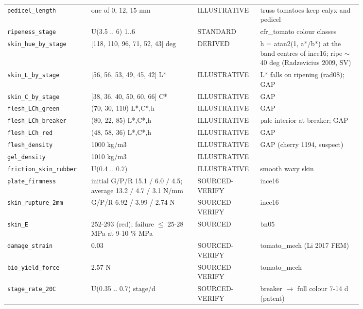 \documentclass[10.5pt,a4paper]{article}
\begin{document}
{\begin{longtable}{@{}p{0.2\linewidth}p{0.27\linewidth}p{0.12\linewidth}p{0.26\linewidth}@{}}
\texttt{pedicel\_\allowbreak{}length} & one of 0, 12, 15 mm & ILLUSTRATIVE & truss tomatoes keep calyx and pedicel \\
\texttt{ripeness\_\allowbreak{}stage} & U(3.5 .. 6) 1..6 & STANDARD & cfr\_tomato colour classes \\
\texttt{skin\_\allowbreak{}hue\_\allowbreak{}by\_\allowbreak{}stage} & [118, 110, 96, 71, 52, 43] deg & DERIVED & h = atan2(1, a*/b*) at the band centres of ince16; ripe $\sim$40 deg (Radzevicius 2009, SV) \\
\texttt{skin\_\allowbreak{}L\_\allowbreak{}by\_\allowbreak{}stage} & [56, 56, 53, 49, 45, 42] L* & ILLUSTRATIVE & L* falls on ripening (rad08); GAP \\
\texttt{skin\_\allowbreak{}C\_\allowbreak{}by\_\allowbreak{}stage} & [38, 36, 40, 50, 60, 66] C* & ILLUSTRATIVE & GAP \\
\texttt{flesh\_\allowbreak{}LCh\_\allowbreak{}green} & (70, 30, 110) L*,C*,h & ILLUSTRATIVE & GAP \\
\texttt{flesh\_\allowbreak{}LCh\_\allowbreak{}breaker} & (80, 22, 85) L*,C*,h & ILLUSTRATIVE & pale interior at breaker; GAP \\
\texttt{flesh\_\allowbreak{}LCh\_\allowbreak{}red} & (48, 58, 36) L*,C*,h & ILLUSTRATIVE & GAP \\
\texttt{flesh\_\allowbreak{}density} & 1000 kg/m3 & ILLUSTRATIVE & GAP (cherry 1194, suspect) \\
\texttt{gel\_\allowbreak{}density} & 1010 kg/m3 & ILLUSTRATIVE &  \\
\texttt{friction\_\allowbreak{}skin\_\allowbreak{}rubber} & U(0.4 .. 0.7) & ILLUSTRATIVE & smooth waxy skin \\
\texttt{plate\_\allowbreak{}firmness} & initial G/P/R 15.1 / 6.0 / 4.5; average 13.2 / 4.7 / 3.1 N/mm & SOURCED-VERIFY & ince16 \\
\texttt{skin\_\allowbreak{}rupture\_\allowbreak{}2mm} & G/P/R 6.92 / 3.99 / 2.74 N & SOURCED-VERIFY & ince16 \\
\texttt{skin\_\allowbreak{}E} & 252-293 (red); failure $\le$ 25-28 MPa at 9-10 \% MPa & SOURCED & bn05 \\
\texttt{damage\_\allowbreak{}strain} & 0.03 & SOURCED-VERIFY & tomato\_mech (Li 2017 FEM) \\
\texttt{bio\_\allowbreak{}yield\_\allowbreak{}force} & 2.57 N & SOURCED-VERIFY & tomato\_mech \\
\texttt{stage\_\allowbreak{}rate\_\allowbreak{}20C} & U(0.35 .. 0.7) stage/d & SOURCED-VERIFY & breaker $\to$ full colour 7-14 d (patent) \\

\end{longtable}}
\end{document}
